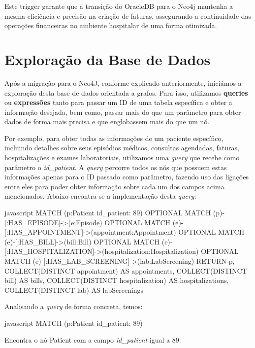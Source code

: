 Este trigger garante que a transição do OracleDB para o Neo4j mantenha a mesma eficiência e precisão na criação de faturas, assegurando a continuidade das operações financeiras no ambiente hospitalar de uma forma otimizada.

\section{Exploração da Base de Dados}

Após a migração para o Neo4J, conforme explicado anteriormente, iniciámos a exploração desta base de dados orientada a grafos. Para isso, utilizamos \textbf{queries} ou \textbf{expressões} tanto para passar um ID de uma tabela específica e obter a informação desejada, bem como, passar mais do que um parâmetro para obter dados de forma mais precisa e que englobassem mais do que um nó.

Por exemplo, para obter todas as informações de um paciente específico, incluindo detalhes sobre seus episódios médicos, consultas agendadas, faturas, hospitalizações e exames laboratoriais, utilizamos uma \textit{query} que recebe como parâmetro o \textit{id\_patient}. A \textit{query} percorre todos os nós que possuem estas informações apenas para o ID passado como parâmetro, fazendo uso das ligações entre eles para poder obter informação sobre cada um dos campos acima mencionados. Abaixo encontra-se a implementação desta \textit{query}:

\begin{myminted}{javascript}
MATCH (p:Patient {id_patient: 89})
OPTIONAL MATCH (p)-[:HAS_EPISODE]->(e:Episode)
OPTIONAL MATCH (e)-[:HAS_APPOINTMENT]->(appointment:Appointment)
OPTIONAL MATCH (e)-[:HAS_BILL]->(bill:Bill)
OPTIONAL MATCH (e)-[:HAS_HOSPITALIZATION]->(hospitalization:Hospitalization)
OPTIONAL MATCH (e)-[:HAS_LAB_SCREENING]->(lab:LabScreening)
RETURN p, 
       COLLECT(DISTINCT appointment) AS appointments, 
       COLLECT(DISTINCT bill) AS bills, 
       COLLECT(DISTINCT hospitalization) AS hospitalizations, 
       COLLECT(DISTINCT lab) AS labScreenings
\end{myminted}

Analisando a \textit{query} de forma concreta, temos:

\begin{myminted}{javascript}
MATCH (p:Patient {id_patient: 89})
\end{myminted}

Encontra o nó Patient com a campo \textit{id\_patient} igual a 89.

